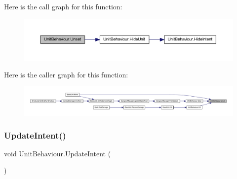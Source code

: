Here is the call graph for this function\+:
\nopagebreak
\begin{figure}[H]
\begin{center}
\leavevmode
\includegraphics[width=350pt]{class_unit_behaviour_adf2d07785a2cc3076363ad5dd0962b9c_cgraph}
\end{center}
\end{figure}
Here is the caller graph for this function\+:
\nopagebreak
\begin{figure}[H]
\begin{center}
\leavevmode
\includegraphics[width=350pt]{class_unit_behaviour_adf2d07785a2cc3076363ad5dd0962b9c_icgraph}
\end{center}
\end{figure}
\mbox{\label{class_unit_behaviour_a38efbe995d8d2f3c522cb2fa076e79cc}} 
\subsubsection{\texorpdfstring{UpdateIntent()}{UpdateIntent()}}
{\footnotesize\ttfamily void Unit\+Behaviour.\+Update\+Intent (\begin{DoxyParamCaption}{ }\end{DoxyParamCaption})}

